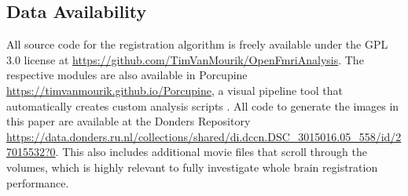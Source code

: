 \subsection{Data Availability}
All source code for the registration algorithm is freely available under the GPL 3.0 license at \url{https://github.com/TimVanMourik/OpenFmriAnalysis}. The respective modules are also available in Porcupine \url{https://timvanmourik.github.io/Porcupine}, a visual pipeline tool that automatically creates custom analysis scripts \cite{VanMourik2017}. All code to generate the images in this paper are available at the Donders Repository \url{https://data.donders.ru.nl/collections/shared/di.dccn.DSC_3015016.05_558/id/27015532?0}. This also includes additional movie files that scroll through the volumes, which is highly relevant to fully investigate whole brain registration performance. 



